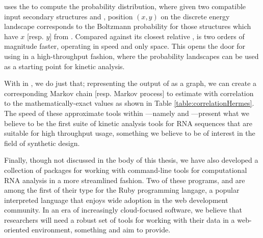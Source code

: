  uses the \fft to compute the \twoD probability distribution, where
given two compatible input secondary structures \strA and \strB, position
$(x,y)$ on the discrete energy landscape corresponds to the Boltzmann
probability for those structures \str which have \bpd $x$ [resp. $y$]
from . Compared against its closest relative \rnatwofold,
\ffttwo is two orders of magnitude faster, operating in  speed and only
 space. This opens the door for using \ffttwo in a high-throughput fashion,
where the probability landscapes can be used as a starting point for kinetic
analysis.

With \hermes in , we do just that; representing the output of
\ffttwo as a graph, we can create a corresponding Markov chain [resp. Markov
process] to estimate  with correlation to the
mathematically-exact values as shown in Table \ref{table:correlationHermes}.
The speed of these approximate tools within \hermes---namely \fftmfpt and
\ffteq---present what we believe to be the first suite of kinetic analysis
tools for RNA sequences that are suitable for high throughput usage, something
we believe to be of interest in the field of synthetic design.

Finally, though not discussed in the body of this thesis, we have also
developed a collection of packages for working with command-line tools for
computational RNA analysis in a more streamlined fashion. Two of these programs,
\href{https://github.com/evansenter/wrnap}{\wrnap} and
\href{https://github.com/evansenter/rbfam}{\rbfam} are among the first of their
type for the Ruby programming langage, a popular interpreted language that
enjoys wide adoption in the web development community. In an era of increasingly
cloud-focused software, we believe that researchers will need a robust set of
tools for working with their data in a web-oriented environment, something
\wrnap and \rbfam aim to provide.
